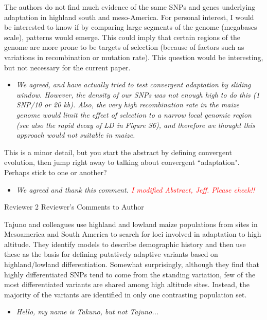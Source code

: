 \documentclass[onecolumn,oneside,letterpaper]{article}
\newcommand{\st}[1]{\textcolor{red}{ #1}}
\begin{document}
The authors do not find much evidence of the same SNPs and genes underlying adaptation in highland south and meso-America. For personal interest, I would be interested to know if by comparing large segments of the genome (megabases scale), patterns would emerge.  This could imply that certain regions of the genome are more prone to be targets of selection  (because of factors such as variations in recombination or mutation rate). This question would be interesting, but not necessary for the current paper.    
\setlength{\parskip}{-5.0pt}
\begin{itemize}
\item \textit{ We agreed, and have actually tried to test convergent adaptation by sliding window.  However, the density of our SNPs was not enough high to do this (1 SNP/10 or 20 kb).  Also, the very high recombination rate in the maize genome would limit the effect of selection to a narrow local genomic region (see also the rapid decay of LD in Figure S6), and therefore we thought this approach would not suitable in maize. }
\end{itemize}
\setlength{\parskip}{10.0pt}

This is a minor detail, but you start the abstract by defining convergent evolution, then jump right away to talking about convergent ``adaptation".  Perhaps stick to one or another? 
\setlength{\parskip}{-5.0pt}
\begin{itemize}
\item \textit{ We agreed and thank this comment.  \st{I modified Abstract, Jeff.  Please check!!} }
\end{itemize}
\setlength{\parskip}{10.0pt}

Reviewer 2 Reviewer's Comments to Author

Tajuno and colleagues use highland and lowland maize populations from sites in Mesoamerica and South America to search for loci involved in adaptation to high altitude.  They identify models to describe demographic history and then use these as the basis for defining putatively adaptive variants based on highland/lowland differentiation.  Somewhat surprisingly, although they find that highly differentiated SNPs tend to come from the standing variation, few of the most differentiated variants are shared among high altitude sites. Instead, the majority of the variants are identified in only one contrasting population set.   
\setlength{\parskip}{-5.0pt}
\begin{itemize}
\item \textit{ Hello, my name is Takuno, but not Tajuno... }
\end{itemize}
\setlength{\parskip}{10.0pt}
\end{document}
